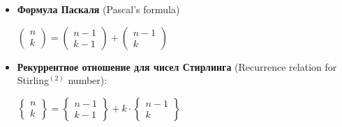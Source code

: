 \documentclass[12pt]{article}
\begin{document}
\begin{itemize}
        $|\Set{\text{разбиение } n \text{ элементов в } k \text{ частей}}| = \begin{Bmatrix}
                                                                                 n \\ k
        \end{Bmatrix} = S^{II}_k (n) = S(n, k)$ - число Стирлинга второго рода

        Для примера выше число Стирлинга $S(4, 2) = \begin{Bmatrix}
                                                        4 \\ 2
        \end{Bmatrix} = 7$

        Согласно Википедии \href{https://ru.wikipedia.org/wiki/%D0%A7%D0%B8%D1%81%D0%BB%D0%B0_%D0%A1%D1%82%D0%B8%D1%80%D0%BB%D0%B8%D0%BD%D0%B3%D0%B0_%D0%B2%D1%82%D0%BE%D1%80%D0%BE%D0%B3%D0%BE_%D1%80%D0%BE%D0%B4%D0%B0}{для формулы Стирлинга}
        есть формула: $S(n, k) = \frac{1}{k!} \sum_{j=0}^k (-1)^{k+j} \begin{pmatrix}
                                                                          k \\ j
        \end{pmatrix}j^n$

        \vspace{5mm}
        \item \textbf{Формула Паскаля} (Pascal's formula)

        $\begin{pmatrix}
             n \\ k
        \end{pmatrix} = \begin{pmatrix}
                            n - 1 \\ k - 1
        \end{pmatrix} + \begin{pmatrix}
                            n - 1 \\ k
        \end{pmatrix}$

        \vspace{5mm}
        \item \textbf{Рекуррентное отношение для чисел Стирлинга} (Recurrence relation for Stirling$^{(2)}$ number):

        $\begin{Bmatrix}
             n \\ k
        \end{Bmatrix} = \begin{Bmatrix}
                            n - 1 \\ k - 1
        \end{Bmatrix} + k \cdot \begin{Bmatrix}
                                    n - 1 \\ k
        \end{Bmatrix}$


\end{itemize}
\end{document}
